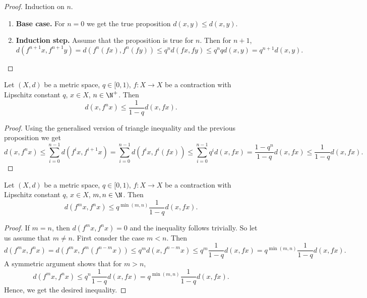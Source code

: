 \begin{proof}
  Induction on $n$.
  \begin{enumerate}
    \item
      \textbf{Base case.}
      For $n = 0$ we get the true proposition $d(x, y) \leq d(x, y)$.
    \item
      \textbf{Induction step.}
      Assume that the proposition is true for $n$.
      Then for $n + 1$,
      \begin{equation}
        d(f^{n + 1}x, f^{n + 1} y)
        = d(f^n(f x), f^n(f y))
        \leq q^n d(f x, f y)
        \leq q^n q d(x, y)
        = q^{n + 1} d(x, y).
      \end{equation}
  \end{enumerate}
\end{proof}
\begin{proposition}
  Let
    $(X, d)$ be a metric space,
    $q \in [0, 1)$,
    $f \colon X \to X$ be a contraction with Lipschitz constant $q$,
    $x \in X$,
    $n \in \N^{+}$.
  Then
  \begin{equation}
    d(x, f^n x) \leq \frac{1}{1 - q} d(x, f x).
  \end{equation}
\end{proposition}
\begin{proof}
  Using
    the generalised version of triangle inequality and
    the previous proposition
  we get
  \begin{equation}
    d(x, f^n x)
    \leq \sum_{i = 0}^{n - 1} d(f^i x, f^{i + 1} x)
    = \sum_{i = 0}^{n - 1} d(f^i x, f^i(f x))
    \leq \sum_{i = 0}^{n - 1} q^i d(x, f x)
    = \frac{1 - q^n}{1 - q} d(x, f x)
    \leq \frac{1}{1 - q} d(x, f x).
  \end{equation}
\end{proof}
\begin{corollary}
  Let
    $(X, d)$ be a metric space,
    $q \in [0, 1)$,
    $f \colon X \to X$ be a contraction with Lipschitz constant $q$,
    $x \in X$,
    $m, n \in \N$.
  Then
  \begin{equation}
    d(f^m x, f^n x) \leq q^{\min(m, n)} \frac{1}{1 - q} d(x, f x).
  \end{equation}
\end{corollary}
\begin{proof}
  If $m = n$, then $d(f^m x, f^n x) = 0$ and the inequality follows trivially.
  So let us assume that $m \neq n$.
  First consder the case $m < n$.
  Then
  \begin{equation}
    d(f^m x, f^n x)
    = d(f^m x, f^m(f^{n - m} x))
    \leq q^m d(x, f^{n - m} x)
    \leq q^m \frac{1}{1 - q} d(x, f x)
    = q^{\min(m, n)} \frac{1}{1 - q} d(x, f x).
  \end{equation}
  A symmetric argument shows that for $m > n$,
  \begin{equation}
    d(f^m x, f^n x)
    \leq q^n \frac{1}{1 - q} d(x, f x)
    = q^{\min(m, n)} \frac{1}{1 - q} d(x, f x).
  \end{equation}
  Hence, we get the desired inequality.
\end{proof}
